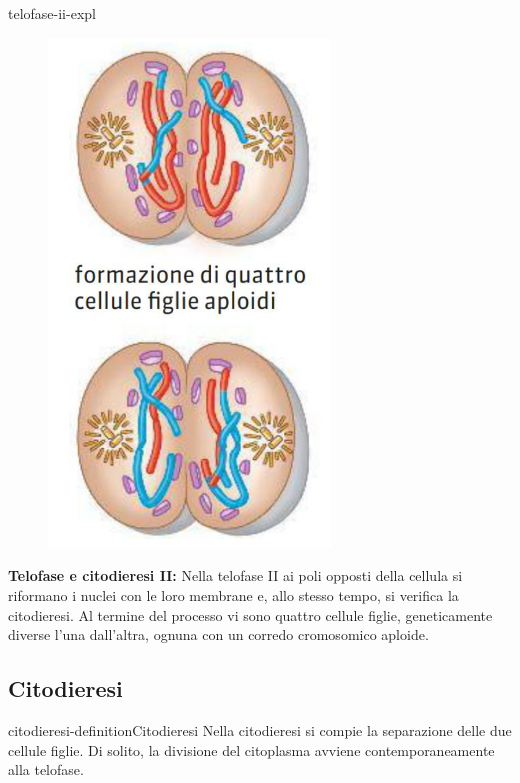 \documentclass[preview]{standalone}
\begin{document}
\begin{snippet}{telofase-ii-expl}
    \setlength{\intextsep}{0pt}%
    \begin{figure}
        \includegraphics[width=7.5cm]{./resources/telofase-ii.png}
        \vspace{-1cm}
    \end{figure}

    \textbf{Telofase e citodieresi II:}
    Nella telofase II ai poli opposti della cellula si riformano i nuclei con le loro membrane e, allo
    stesso tempo, si verifica la citodieresi. Al termine del processo vi sono quattro cellule figlie,
    geneticamente diverse l'una dall'altra, ognuna con un corredo cromosomico aploide.
    \wrapfill
\end{snippet}

\subsection{Citodieresi}

\begin{snippetdefinition}{citodieresi-definition}{Citodieresi}
    Nella citodieresi si compie la separazione delle due cellule figlie. Di solito, la divisione del
citoplasma avviene contemporaneamente alla telofase.
\end{snippetdefinition}
\end{document}
